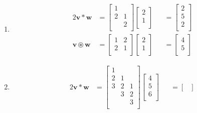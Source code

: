 \documentclass[a4paper]{article}
\begin{document}
\begin{enumerate}[label=(\alph*)]
	\item \begin{alignat*}{2}
	      		\pmb{v * w} & = \begin{bmatrix}
	      			1 & \\
	      			2 & 1 \\
	      			 & 2 \\
	      		\end{bmatrix}
			\begin{bmatrix}
				2 \\
				1 \\
			\end{bmatrix} && = 
			\begin{bmatrix}
				2 \\
				5 \\
				2 \\
			\end{bmatrix} \\
			\pmb{v \circledast w} & = \begin{bmatrix}
				1 & 2 \\
				2 & 1 \\
			\end{bmatrix}
			\begin{bmatrix}
				2 \\
				1 \\
			\end{bmatrix} && = 
			\begin{bmatrix}
				4 \\
				5 \\
			\end{bmatrix}
	      \end{alignat*}
	\item \begin{alignat*}{2}
			\pmb{v * w} & = \begin{bmatrix}
				1 &  & \\
				2 & 1 & \\
				3 & 2 & 1 \\
				 & 3 & 2 \\
				 &  & 3 \\
			\end{bmatrix}
			\begin{bmatrix}
				4\\
				5\\
				6\\
			\end{bmatrix} && = 
			\begin{bmatrix}

\end{bmatrix}
\end{alignat*}
\end{enumerate}
\end{document}
